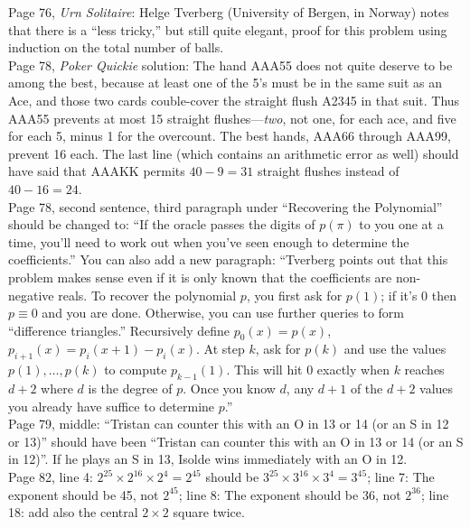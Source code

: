 \documentclass[11pt]{article}
\begin{document}
Page 76, {\em Urn Solitaire}: Helge Tverberg (University of Bergen, in Norway) notes
that there is a ``less tricky,'' but still quite elegant, proof for this problem using
induction on the total number of balls.\\

Page 78, {\em Poker Quickie} solution:  The hand AAA55 does not quite deserve to be among
the best, because at least one of the 5's must be in the same suit as an Ace, and those two cards
couble-cover the straight flush A2345 in that suit.  Thus AAA55 prevents at most 15 straight
flushes---{\em two}, not one, for each ace, and five for each 5, minus 1 for the overcount.
The best hands, AAA66 through AAA99, prevent 16 each.  The last line (which contains an arithmetic
error as well) should have said that AAAKK permits $40 - 9 = 31$ straight flushes instead of $40 - 16 = 24$. \\

Page 78, second sentence, third paragraph under ``Recovering the Polynomial'' should be changed to:
``If the oracle passes the digits of $p(\pi)$ to you one at a time, you'll need to work out when
you've seen enough to determine the coefficients.''  You can also add a new paragraph:
``Tverberg points out that this
problem makes sense even if it is only known that the coefficients are non-negative
reals.  To recover the polynomial $p$, you first ask for $p(1)$; if it's 0 then
$p \equiv 0$ and you are done.  Otherwise, you can use further queries to
form ``difference triangles.''  Recursively define $p_0(x) = p(x)$, $p_{i+1}(x) =
p_i(x{+}1)-p_i(x)$.  At step $k$, ask for $p(k)$ and use the values $p(1),\dots,p(k)$
to compute $p_{k-1}(1)$.  This will hit 0 exactly when $k$ reaches $d{+}2$ where $d$ is the degree
of $p$. Once you know $d$, any $d{+}1$ of the $d{+}2$ values you already have suffice to
determine $p$.''\\

Page 79, middle:  ``Tristan can counter this with an O in 13 or 14 (or an S in 12 or 13)'' should
have been ``Tristan can counter this with an O in 13 or 14 (or an S in 12)''.  If he plays an S in 13,
Isolde wins immediately with an O in 12.\\

Page 82, line 4: $2^{25} \times 2^{16} \times 2^4 = 2^{45}$ should be $3^{25} \times 3^{16} \times 3^4 = 3^{45}$;
line 7: The exponent should be 45, not $2^{45}$;
line 8: The exponent should be 36, not $2^{36}$;
line 18: add also the central $2 \times 2$ square twice.\\
\end{document}
